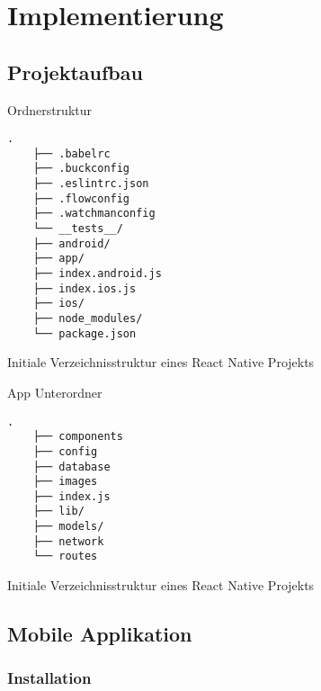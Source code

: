 \section{Implementierung}

    \subsection{Projektaufbau}
Ordnerstruktur

    
    \begin{lstlisting}[style=tree]
    .
    ├── .babelrc
    ├── .buckconfig
    ├── .eslintrc.json
    ├── .flowconfig
    ├── .watchmanconfig
    └── __tests__/
    ├── android/
    ├── app/
    ├── index.android.js
    ├── index.ios.js
    ├── ios/
    ├── node_modules/
    └── package.json
    \end{lstlisting}
    \vspace{-0.5 cm}
    \begin{listing}[H]
        \caption{Initiale Verzeichnisstruktur eines React Native Projekts}
        \label{lst:idirectory_structure}
    \end{listing}
    
App Unterordner
    \begin{lstlisting}[style=tree]
    .
    ├── components
    ├── config
    ├── database
    ├── images
    ├── index.js
    ├── lib/
    ├── models/
    ├── network
    └── routes

    \end{lstlisting}
    \vspace{-0.5 cm}
    \begin{listing}[H]
        \caption{Initiale Verzeichnisstruktur eines React Native Projekts}
        \label{lst:idirectory_structure}
    \end{listing}
        
        
        
    \subsection{Mobile Applikation}
        
        \subsubsection{Installation}
